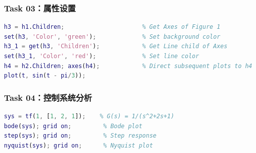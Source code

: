 \documentclass{../common/SCNU_Experimental_Report}
\begin{document}
\subsubsection{Task 03：属性设置}
\begin{lstlisting}[language=Matlab]
h3 = h1.Children;                      % Get Axes of Figure 1
set(h3, 'Color', 'green');             % Set background color
h3_1 = get(h3, 'Children');            % Get Line child of Axes
set(h3_1, 'Color', 'red');             % Set line color
h4 = h2.Children; axes(h4);            % Direct subsequent plots to h4
plot(t, sin(t - pi/3));
\end{lstlisting}

\subsubsection{Task 04：控制系统分析}
\begin{lstlisting}[language=Matlab]
sys = tf(1, [1, 2, 1]);    % G(s) = 1/(s^2+2s+1)
bode(sys); grid on;         % Bode plot
step(sys); grid on;         % Step response
nyquist(sys); grid on;      % Nyquist plot
\end{lstlisting}
\end{document}
